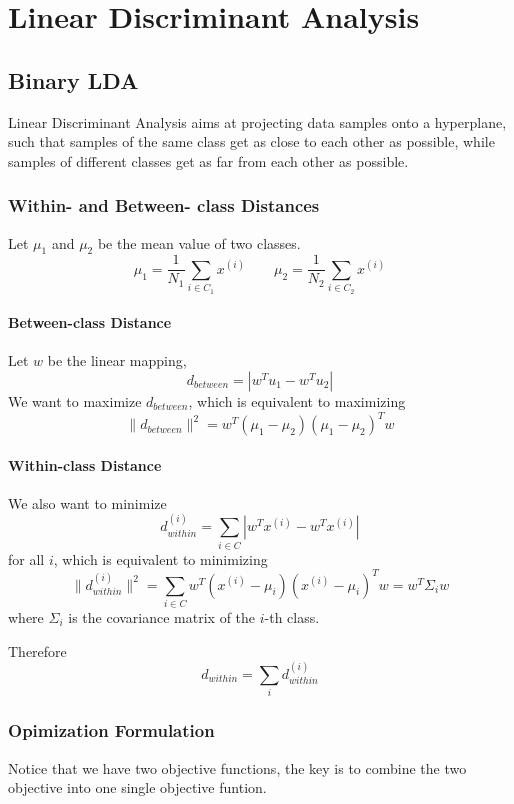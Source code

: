 \chapter{Linear Discriminant Analysis}
\newpage

\section{Binary LDA}
    Linear Discriminant Analysis aims at projecting data samples onto a hyperplane, such that samples of the same class get as close to each other as possible, while samples of different classes get as far from each other as possible.

    \subsection{Within- and Between- class Distances}
        Let $\mu_1$ and $\mu_2$ be the mean value of two classes.
        \[ \mu_1 = \frac{1}{N_1}\sum_{i\in C_1}x^{(i)} \qquad \mu_2 = \frac{1}{N_2}\sum_{i\in C_2}x^{(i)} \]

        \subsubsection{Between-class Distance}
        Let $w$ be the linear mapping,
        \[ d_{between} = |w^Tu_1 - w^Tu_2| \]
        We want to maximize $d_{between}$, which is equivalent to maximizing
        \[ \|d_{between}\|^2 = w^T(\mu_1-\mu_2)(\mu_1-\mu_2)^Tw\]

        \subsubsection{Within-class Distance}
        We also want to minimize
        \[ d_{within}^{(i)} = \sum_{i\in C}|w^Tx^{(i)} -w^Tx^{(i)}| \]
        for all $i$, which is equivalent to minimizing
        \[ \|d_{within}^{(i)}\|^2 = \sum_{i\in C}w^T(x^{(i)}-\mu_i)(x^{(i)}-\mu_i)^Tw = w^T\Sigma_iw \]
        where $\Sigma_i$ is the covariance matrix of the $i$-th class.

        Therefore
        \[ d_{within} = \sum_i d_{within}^{(i)} \]

    \subsection{Opimization Formulation}
        Notice that we have two objective functions, the key is to combine the two objective into one single objective funtion.

